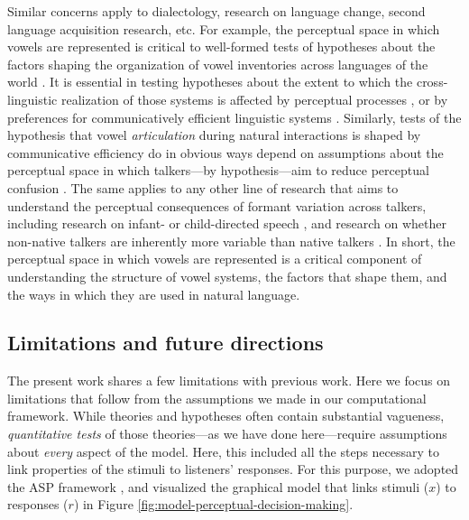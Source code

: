 \documentclass[preprint]{JASA}
\begin{document}
Similar concerns apply to dialectology, research on language change, second language acquisition research, etc. For example, the perceptual space in which vowels are represented is critical to well-formed tests of hypotheses about the factors shaping the organization of vowel inventories across languages of the world \citep{lindblom1986, stevens1972, stevens1989}. It is essential in testing hypotheses about the extent to which the cross-linguistic realization of those systems is affected by perceptual processes \citep{flemming2010, steriade2001}, or by preferences for communicatively efficient linguistic systems \citep[e.g.,][]{hall2018, lindblom1990, moulin2015}. Similarly, tests of the hypothesis that vowel \emph{articulation} during natural interactions is shaped by communicative efficiency do in obvious ways depend on assumptions about the perceptual space in which talkers---by hypothesis---aim to reduce perceptual confusion \citep[cf.][]{buz-jaeger2016, gahl2012, scarborough2010, wedel2018}. The same applies to any other line of research that aims to understand the perceptual consequences of formant variation across talkers, including research on infant- or child-directed speech \citep{eaves2016, kuhl1997}, and research on whether non-native talkers are inherently more variable than native talkers \citep{smith2019, vaughn2019, xie-jaeger2020}. In short, the perceptual space in which vowels are represented is a critical component of understanding the structure of vowel systems, the factors that shape them, and the ways in which they are used in natural language.

\subsection{Limitations and future directions}\label{limitations-and-future-directions}

The present work shares a few limitations with previous work. Here we focus on limitations that follow from the assumptions we made in our computational framework. While theories and hypotheses often contain substantial vagueness, \emph{quantitative tests} of those theories---as we have done here---require assumptions about \emph{every} aspect of the model. Here, this included all the steps necessary to link properties of the stimuli to listeners' responses. For this purpose, we adopted the ASP framework \citep{xie2023}, and visualized the graphical model that links stimuli (\(x\)) to responses (\(r\)) in Figure \ref{fig:model-perceptual-decision-making}.
\end{document}
